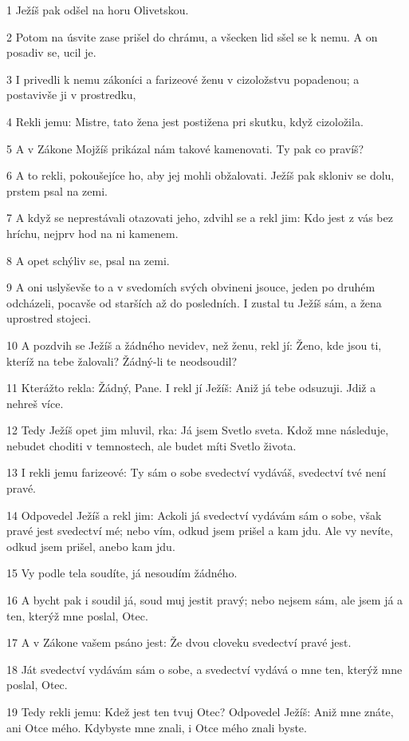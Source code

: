 \par 1 Ježíš pak odšel na horu Olivetskou.
\par 2 Potom na úsvite zase prišel do chrámu, a všecken lid sšel se k nemu. A on posadiv se, ucil je.
\par 3 I privedli k nemu zákoníci a farizeové ženu v cizoložstvu popadenou; a postavivše ji v prostredku,
\par 4 Rekli jemu: Mistre, tato žena jest postižena pri skutku, když cizoložila.
\par 5 A v Zákone Mojžíš prikázal nám takové kamenovati. Ty pak co pravíš?
\par 6 A to rekli, pokoušejíce ho, aby jej mohli obžalovati. Ježíš pak skloniv se dolu, prstem psal na zemi.
\par 7 A když se neprestávali otazovati jeho, zdvihl se a rekl jim: Kdo jest z vás bez hríchu, nejprv hod na ni kamenem.
\par 8 A opet schýliv se, psal na zemi.
\par 9 A oni uslyševše to a v svedomích svých obvineni jsouce, jeden po druhém odcházeli, pocavše od starších až do posledních. I zustal tu Ježíš sám, a žena uprostred stojeci.
\par 10 A pozdvih se Ježíš a žádného nevidev, než ženu, rekl jí: Ženo, kde jsou ti, kteríž na tebe žalovali? Žádný-li te neodsoudil?
\par 11 Kterážto rekla: Žádný, Pane. I rekl jí Ježíš: Aniž já tebe odsuzuji. Jdiž a nehreš více.
\par 12 Tedy Ježíš opet jim mluvil, rka: Já jsem Svetlo sveta. Kdož mne následuje, nebudet choditi v temnostech, ale budet míti Svetlo života.
\par 13 I rekli jemu farizeové: Ty sám o sobe svedectví vydáváš, svedectví tvé není pravé.
\par 14 Odpovedel Ježíš a rekl jim: Ackoli já svedectví vydávám sám o sobe, však pravé jest svedectví mé; nebo vím, odkud jsem prišel a kam jdu. Ale vy nevíte, odkud jsem prišel, anebo kam jdu.
\par 15 Vy podle tela soudíte, já nesoudím žádného.
\par 16 A bycht pak i soudil já, soud muj jestit pravý; nebo nejsem sám, ale jsem já a ten, kterýž mne poslal, Otec.
\par 17 A v Zákone vašem psáno jest: Že dvou cloveku svedectví pravé jest.
\par 18 Ját svedectví vydávám sám o sobe, a svedectví vydává o mne ten, kterýž mne poslal, Otec.
\par 19 Tedy rekli jemu: Kdež jest ten tvuj Otec? Odpovedel Ježíš: Aniž mne znáte, ani Otce mého. Kdybyste mne znali, i Otce mého znali byste.

